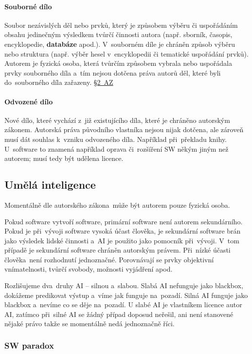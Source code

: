 \paragraph{Souborné dílo} Soubor nezávislých děl nebo prvků, který je způsobem výběru či uspořádáním obsahu jedinečným výsledkem tvůrčí činnosti autora (např. sborník, časopis, encyklopedie, \textbf{databáze} apod.). V~souborném díle je chráněn způsob výběru nebo struktura (např. výběr hesel v~encyklopedii či tematické uspořádání prvků). Autorem je fyzická osoba, která tvůrčím způsobem vybrala nebo uspořádala prvky souborného díla a~tím nejsou dotčena práva autorů děl, které byli do~souborného díla zařazeny. \href{https://www.zakonyprolidi.cz/cs/2000-121#p2}{§2~AZ}

\paragraph{Odvozené dílo} Nové dílo, které vychází z~již existujícího díla, které je chráněno autorským zákonem. Autorská práva původního vlastníka nejsou nijak dotčena, ale zároveň musí dát souhlas k~vzniku odvozeného díla. Například při~překladu knihy. U~software to znamená například oprava či~rozšíření SW někým jiným než autorem; musí tedy být udělena licence.

\subsection{Umělá inteligence}

Momentálně dle autorského zákona~může být autorem pouze fyzická osoba.

Pokud software vytvoří software, primární software není autorem sekundárního. Pokud je při~vývoji software vysoká účast člověka, je sekundární software brán jako výsledek lidské činnosti a~AI je použito jako pomocník při~vývoji. V~tom případě je sekundární software chráněn autorským právem. Při~nízké účasti člověka~není rozhodnutí jednoznačné. Porovnávají se prvky objektivní vnímatelnosti, tvůrčí svobody, možnosti vyjádření apod.

Rozlišujeme dva~druhy AI -- silnou a~slabou. Slabá AI nefunguje jako blackbox, dokážeme predikovat výstup a~víme jak funguje na~pozadí. Silná AI funguje jako blackbox a~nevíme co se děje na~pozadí. U slabé AI je vlastníkem licence autor AI, zatímco při~silné AI se žádný případ doposud neřešil, ani není stanovené nějaké právo takže se momentálně nedá jednoznačně říci.

\subsubsection{SW paradox}

